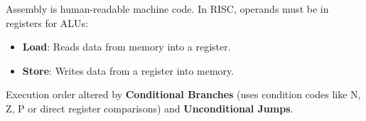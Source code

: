 \begin{definition}
Assembly is human-readable machine code.
In RISC, operands must be in registers for ALUs:
\begin{itemize}
    \item \textbf{Load}: Reads data from memory into a register.
    \item \textbf{Store}: Writes data from a register into memory.
\end{itemize}
\end{definition}

\begin{remark}
Execution order altered by \textbf{Conditional Branches} (uses condition codes like N, Z, P or direct register comparisons) and \textbf{Unconditional Jumps}.
\end{remark}
